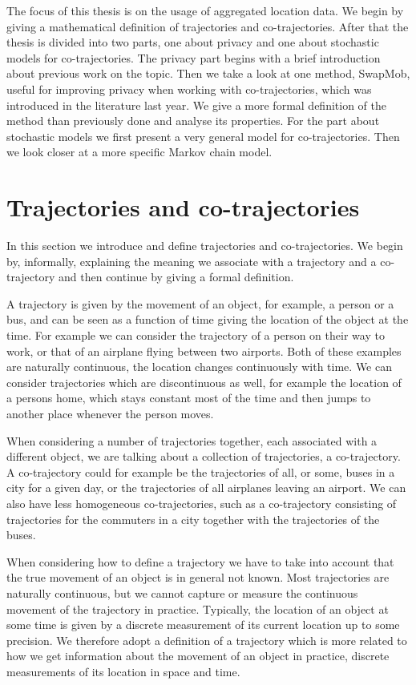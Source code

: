 \documentclass[12pt]{article}
\theoremstyle{definition}
\begin{document}
The focus of this thesis is on the usage of aggregated location data.
We begin by giving a mathematical definition of trajectories and
co-trajectories. After that the thesis is divided into two parts, one
about privacy and one about stochastic models for co-trajectories. The
privacy part begins with a brief introduction about previous work on
the topic. Then we take a look at one method, SwapMob, useful for
improving privacy when working with co-trajectories, which was
introduced in the literature last year. We give a more formal
definition of the method than previously done and analyse its
properties. For the part about stochastic models we first present a
very general model for co-trajectories. Then we look closer at a more
specific Markov chain model.

\section{Trajectories and co-trajectories}
\label{sec:traj-and-co-traj}
In this section we introduce and define trajectories and
co-trajectories. We begin by, informally, explaining the meaning we
associate with a trajectory and a co-trajectory and then continue by
giving a formal definition.

A trajectory is given by the movement of an object, for example, a
person or a bus, and can be seen as a function of time giving the
location of the object at the time. For example we can consider the
trajectory of a person on their way to work, or that of an airplane
flying between two airports. Both of these examples are naturally
continuous, the location changes continuously with time. We can
consider trajectories which are discontinuous as well, for example the
location of a persons home, which stays constant most of the time and
then jumps to another place whenever the person moves.

When considering a number of trajectories together, each associated
with a different object, we are talking about a collection of
trajectories, a co-trajectory. A co-trajectory could for example be
the trajectories of all, or some, buses in a city for a given day, or
the trajectories of all airplanes leaving an airport. We can also have
less homogeneous co-trajectories, such as a co-trajectory consisting
of trajectories for the commuters in a city together with the
trajectories of the buses.

When considering how to define a trajectory we have to take into
account that the true movement of an object is in general not known.
Most trajectories are naturally continuous, but we cannot capture or
measure the continuous movement of the trajectory in practice.
Typically, the location of an object at some time is given by a
discrete measurement of its current location up to some precision. We
therefore adopt a definition of a trajectory which is more related to
how we get information about the movement of an object in practice,
discrete measurements of its location in space and time.
\end{document}
